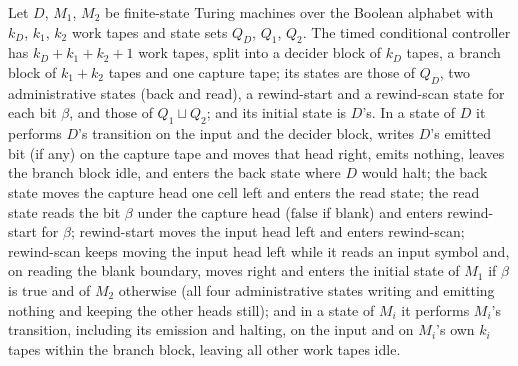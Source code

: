 \begin{definition}
\label{Turing.FinTM.timedCondTM}
\leanok
{}
Let $D$, $M_1$, $M_2$ be finite-state Turing machines over the Boolean alphabet with
$k_D$, $k_1$, $k_2$ work tapes and state sets $Q_D$, $Q_1$, $Q_2$. The timed conditional
controller has $k_D + k_1 + k_2 + 1$ work tapes, split into a decider block of $k_D$
tapes, a branch block of $k_1 + k_2$ tapes and one capture tape; its states are those of
$Q_D$, two administrative states (back and read), a rewind-start and a rewind-scan state
for each bit $\beta$, and those of $Q_1 \sqcup Q_2$; and its initial state is $D$'s. In a
state of $D$ it performs $D$'s transition on the input and the decider block, writes $D$'s
emitted bit (if any) on the capture tape and moves that head right, emits nothing, leaves
the branch block idle, and enters the back state where $D$ would halt; the back state
moves the capture head one cell left and enters the read state; the read state reads the
bit $\beta$ under the capture head ($\mathrm{false}$ if blank) and enters rewind-start
for $\beta$; rewind-start moves the input head left and enters rewind-scan; rewind-scan
keeps moving the input head left while it reads an input symbol and, on reading the
blank boundary, moves right and enters the initial state of $M_1$ if $\beta$ is
$\mathrm{true}$ and of $M_2$ otherwise (all four administrative states writing and
emitting nothing and keeping the other heads still); and in a state of $M_i$ it performs
$M_i$'s transition, including its emission and halting, on the input and on $M_i$'s own
$k_i$ tapes within the branch block, leaving all other work tapes idle.
\end{definition}

